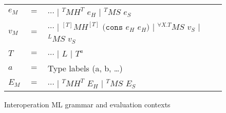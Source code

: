 \begin{figure}[p]
\centering
\begin{tabular}{lcl}
\vspace{5pt}

$e_{M}$ & $=$ & $\cdots$ $\vert$ $^{T}MH^{T}$ $e_{H}$ $\vert$ $^{T}MS$ $e_{S}$ \\

\vspace{5pt}

$v_{M}$ & $=$ & $\cdots$ $\vert$ $^{[T]}MH^{[T]}$ $(\mathtt{cons}$ $e_{H}$ $e_{H})$ $\vert$ $^{\forall X.T}MS$ $v_{S}$ $\vert$ $^{L}MS$ $v_{S}$ \\

\vspace{5pt}

$T$ & $=$ & $\cdots$ $\vert$ $L$ $\vert$ $T^{a}$ \\

\vspace{5pt}

$a$ & $=$ & Type labels (a, b, \ldots) \\

\vspace{5pt}

$E_{M}$ & $=$ & $\cdots$ $\vert$ $^{T}MH^{T}$ $E_{H}$ $\vert$ $^{T}MS$ $E_{S}$
\end{tabular}
\caption{Interoperation ML grammar and evaluation contexts}
\label{img}
\end{figure}